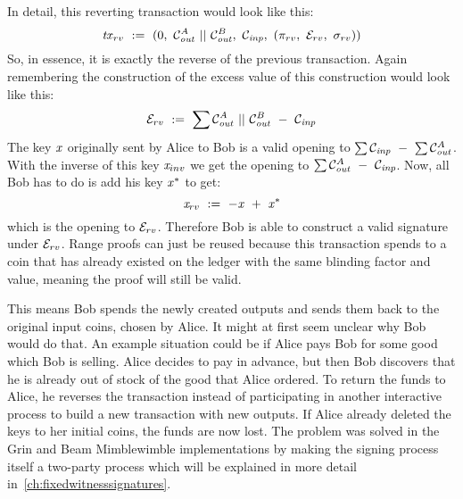 In detail, this reverting transaction would look like this:
\[ \mathit{tx}_{rv} ~:=~ (0 ,~ \mathcal{C}_{\mathit{out}}^A ~||~ \mathcal{C}_{\mathit{out}}^B ,~ \mathcal{C}_{\mathit{inp}} ,~ (\pi_{rv} ,~ \mathcal{E}_{rv} ,~ \sigma_{rv}) ) \]
So, in essence, it is exactly the reverse of the previous transaction.
Again remembering the construction of the excess value of this construction would look like this:
\[ \mathcal{E}_{rv} ~:=~ \sum{\mathcal{C}_{\mathit{out}}^A ~||~\mathcal{C}_{\mathit{out}}^B ~-~\mathcal{C}_{\mathit{inp}}} \]
The key $\mathit{x}$ originally sent by Alice to Bob is a valid opening to $\sum{\mathcal{C}_{\mathit{inp}}} ~-~ \sum{\mathcal{C}_{\mathit{out}}^A}$. With the inverse of this key $\mathit{x}_{inv}$ we get the opening to $\sum{\mathcal{C}_{\mathit{out}}^A ~-~\mathcal{C}_{\mathit{inp}}}$.
Now, all Bob has to do is add his key $\mathit{x}^*$ to get:
\[ \mathit{x}_{rv} ~:=~ -\mathit{x} ~+~ \mathit{x}^* \]
which is the opening to $\mathcal{E}_{rv}$.
Therefore Bob is able to construct a valid signature under $\mathcal{E}_{rv}$.
Range proofs can just be reused because this transaction spends to a coin that has already existed on the ledger with the same blinding factor and value, meaning the proof will still be valid.

This means Bob spends the newly created outputs and sends them back to the original input coins, chosen by Alice.
It might at first seem unclear why Bob would do that.
An example situation could be if Alice pays Bob for some good which Bob is selling.
Alice decides to pay in advance, but then Bob discovers that he is already out of stock of the good that Alice ordered.
To return the funds to Alice, he reverses the transaction instead of participating in another interactive process to build a new transaction with new outputs.
If Alice already deleted the keys to her initial coins, the funds are now lost.
The problem was solved in the Grin and Beam Mimblewimble implementations by making the signing process itself a two-party process which will be explained in more detail in~\cref{ch:fixedwitnesssignatures}.

